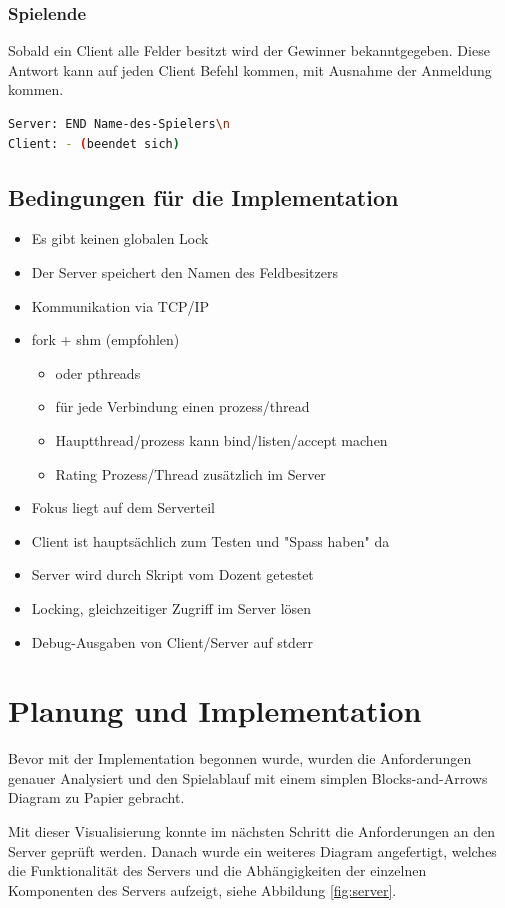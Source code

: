 \subsection{Spielende}
Sobald ein Client alle Felder besitzt wird der Gewinner bekanntgegeben. Diese Antwort kann auf jeden Client Befehl kommen, mit Ausnahme der Anmeldung kommen.
\begin{lstlisting}[language=bash,caption={Spielstart}]
Server: END Name-des-Spielers\n
Client: - (beendet sich)
\end{lstlisting}

\section{Bedingungen für die Implementation}
\begin{itemize}
	\item Es gibt keinen globalen Lock
	\item Der Server speichert den Namen des Feldbesitzers
	\item Kommunikation via TCP/IP
	\item fork + shm (empfohlen)
	\begin{itemize}
		\item oder pthreads
		\item für jede Verbindung einen prozess/thread
		\item Hauptthread/prozess kann bind/listen/accept machen
		\item Rating Prozess/Thread zusätzlich im Server
	\end{itemize}
	\item Fokus liegt auf dem Serverteil
	\item Client ist hauptsächlich zum Testen und "Spass haben" da
	\item Server wird durch Skript vom Dozent getestet
	\item Locking, gleichzeitiger Zugriff im Server lösen
	\item Debug-Ausgaben von Client/Server auf stderr
\end{itemize}

\chapter{Planung und Implementation}
Bevor mit der Implementation begonnen wurde, wurden die Anforderungen genauer Analysiert und den Spielablauf mit einem simplen Blocks-and-Arrows Diagram zu Papier gebracht.

Mit dieser Visualisierung konnte im nächsten Schritt die Anforderungen an den Server geprüft werden. Danach wurde ein weiteres Diagram angefertigt, welches die Funktionalität des Servers und die Abhängigkeiten der einzelnen Komponenten des Servers aufzeigt, siehe Abbildung \ref{fig:server}.

